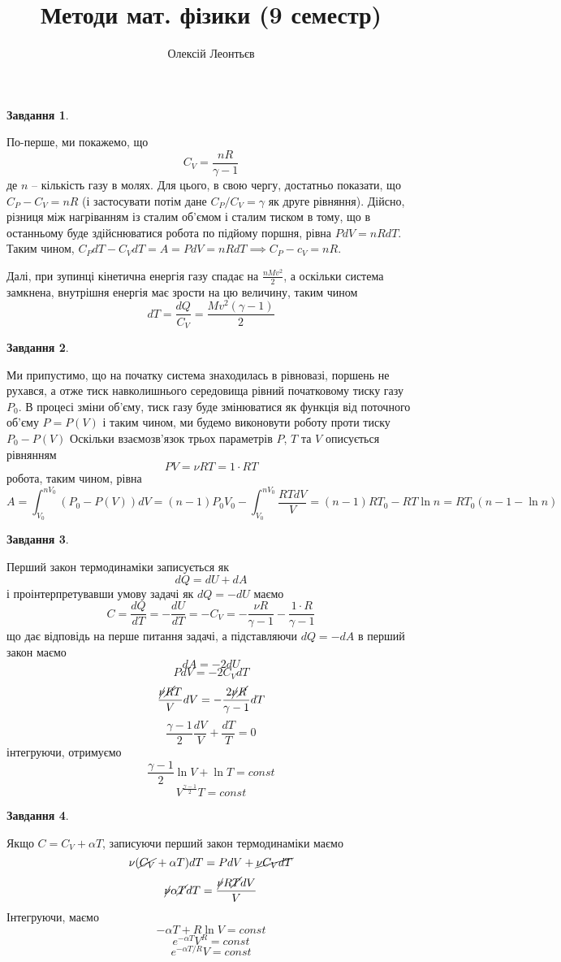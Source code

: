 \documentclass[12pt]{article} %
\title{Методи мат. фізики (9 семестр)}
\author{Олексій Леонтьєв}
\newtheorem{prob}{Завдання}
\begin{document}
\maketitle
\begin{prob}\end{prob}
	По-перше, ми покажемо, що \[C_V=\frac{nR}{\gamma-1}\]
	де $n$ -- кількість газу в молях. Для цього, в свою чергу, достатньо показати, що $C_P-C_V=nR$ (і застосувати потім дане $C_P/C_V=\gamma$
	як друге рівняння). Дійсно, різниця між нагріванням із сталим об’ємом і сталим тиском в тому, що в останньому буде здійснюватися робота по
	підйому поршня, рівна $PdV=nRdT$. Таким чином, $C_PdT-C_VdT=A=PdV=nRdT\implies C_P-c_V=nR$.

	Далі, при зупинці кінетична енергія газу спадає на $\frac{nMv^2}{2}$, а оскільки система замкнена, внутрішня енергія має зрости на цю
	величину, таким чином
	\[dT=\frac{dQ}{C_V}=\frac{Mv^2(\gamma-1)}{2}\]
\begin{prob}\end{prob}
	Ми припустимо, що на початку система знаходилась в рівновазі, поршень не рухався, а отже тиск навколишнього середовища рівний початковому
	тиску газу $P_0$. В процесі зміни об’єму, тиск газу буде змінюватися як функція від поточного об’єму $P=P(V)$ і таким чином, ми
	будемо виконовути роботу проти тиску $P_0-P(V)$ 
	Оскільки  взаємозв’язок трьох параметрів $P$, $T$ та $V$ описується рівнянням
	\[PV=\nu RT=1\cdot RT\]
	робота, таким чином, рівна 
	\[A=\int_{V_0}^{nV_0}(P_0-P(V))dV=(n-1)P_0V_0-\int_{V_0}^{nV_0}\frac{RTdV}{V}=(n-1)RT_0-RT\ln n=RT_0(n-1-\ln n)\]
\begin{prob}\end{prob}
	Перший закон термодинаміки записується як
	\[dQ=dU+dA\]
	і проінтерпретувавши умову задачі як $dQ=-dU$ маємо
	\[C=\frac{dQ}{dT}=-\frac{dU}{dT}=-C_V=-\frac{\nu R}{\gamma-1}-\frac{1\cdot R}{\gamma-1}\]
	що дає відповідь на перше питання задачі, а підставляючи $dQ=-dA$ в перший закон маємо
	\[dA=-2dU\]
	\[PdV=-2C_VdT\]
	\[\frac{ \cancel{\nu}\cancel{ R}T}{V}dV=-\frac{2\cancel{\nu}\cancel{ R}}{\gamma-1}dT\]
	\[\frac{\gamma-1}{2}\frac{dV}{V}+\frac{dT}{T}=0\]
	інтегруючи, отримуємо
	\[\frac{\gamma-1}{2}\ln V+\ln T=const\]
	\[V^{\frac{\gamma-1}{2}}T=const\]
\begin{prob}\end{prob}
	Якщо $C=C_V+\alpha T$, записуючи перший закон термодинаміки маємо
	\[\nu (\cancel{C_V}+\alpha T)dT=PdV+\cancel{\nu C_VdT}\]
	\[\cancel{\nu}\alpha \cancel{T}dT=\frac{\cancel{\nu} R\cancel{T}dV}{V}\]
	Інтегруючи, маємо
	\[-\alpha T+R\ln V=const\]
	\[e^{-\alpha T}V^R=const\]
	\[e^{-\alpha T/R}V=const\]
\end{document}
